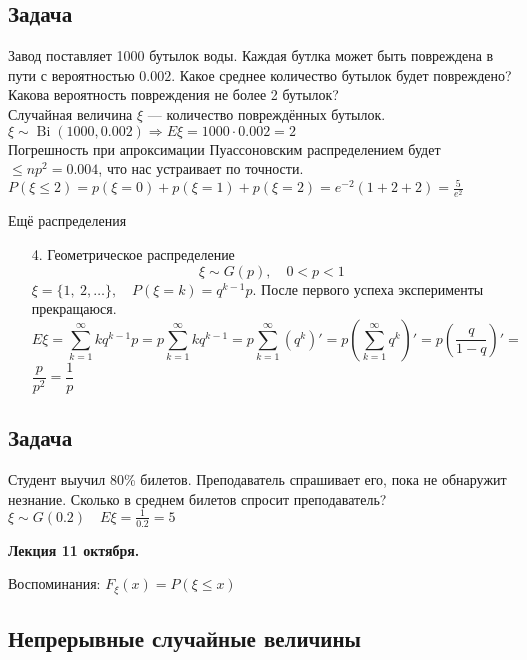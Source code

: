 \documentclass[12pt, a4paper]{article}
\begin{document}
    \subsection*{Задача}
    Завод поставляет 1000 бутылок воды. Каждая бутлка может быть повреждена в пути с вероятностью $0.002$. Какое среднее количество бутылок будет повреждено? Какова вероятность повреждения не более 2 бутылок?\\
    Случайная величина $\xi$ --- количество повреждённых бутылок.\\
    $\xi \sim \operatorname{Bi}(1000, 0.002)\Rightarrow E\xi = 1000\cdot 0.002 = 2$\\
    Погрешность при апроксимации Пуассоновским распределением будет $\leq np^2 = 0.004$, что нас устраивает по точности.\\
    $P(\xi \leq 2) = p(\xi = 0) + p(\xi = 1) + p(\xi = 2) = e^{-2}(1 + 2 + 2) = \frac{5}{e^2}$
    \begin{center}
        Ещё распределения
    \end{center}
    \begin{enumerate}
        \item[4.] Геометрическое распределение
        \[\xi\sim G(p),\quad 0 < p < 1\]
        $\xi = \{1,\ 2,\dots\},\quad P(\xi = k) = q^{k - 1}p$. После первого успеха эксперименты прекращаюся.\\
        \[E\xi = \sum_{k = 1}^{\infty} k q^{k - 1} p = p \sum_{k = 1}^{\infty} k q^{k - 1} = p \sum_{k = 1}^{\infty}\left( q^k \right)' = p\left( \sum_{k = 1}^{\infty} q^k \right)' =  p\left( \frac{q}{1 - q} \right)' =\]
        $\dfrac{p}{p^2} = \dfrac{1}{p}$
    \end{enumerate}
    \subsection*{Задача}
    Студент выучил 80\% билетов. Преподаватель спрашивает его, пока не обнаружит незнание. Сколько в среднем билетов спросит преподаватель?\\
    $\xi \sim G(0.2)\quad E\xi = \frac{1}{0.2} = 5$

    \begin{center}
        \bf Лекция 11 октября.
    \end{center}
    Воспоминания: $F_{\xi}(x) = P(\xi \leq x)$
    \begin{center}
        \section*{Непрерывные случайные величины}
    \end{center}
\end{document}
